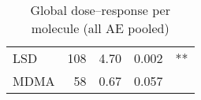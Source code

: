 \begin{table}[!h]
\centering
\caption{Global dose–response per molecule (all AE pooled)}
\centering
\begin{tabular}[t]{lrlll}
\toprule
LSD & 108 & 4.70 & 0.002 & **\\
MDMA & 58 & 0.67 & 0.057 & \\
\bottomrule
\end{tabular}
\end{table}
